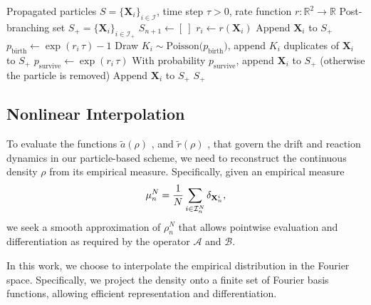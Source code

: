 \documentclass[a4paper,fleqn]{cas-sc}
\theoremstyle{definition}
\theoremstyle{remark}
\begin{document}
\begin{algorithm}
\caption{Birth--Death Step}\label{alg:birthdeath}
\begin{algorithmic}
\Require Propagated particles $S=\{\mathbf X_{i}\}_{i\in\mathcal I}$, time step $\tau>0$, rate function $r:\mathbb R^2\to\mathbb R$
\Ensure Post-branching set $S_{+}=\{\mathbf X_{i}\}_{i\in\mathcal I_{+}}$
    \State $S_{n+1}\gets [\ ]$
        \State $r_i \gets r(\mathbf X_{i})$
         
            \State Append $\mathbf X_{i}$ to $S_{+}$ 
            \State $p_{\mathrm{birth}} \gets \exp(r_i\,\tau) - 1$
            \State Draw $K_i \sim \mathrm{Poisson}\!\big(p_{\mathrm{birth}}\big)$, append $K_i$ duplicates of $\mathbf X_{i}$ to $S_{+}$
         
            \State $p_{\mathrm{survive}}\gets \exp(r_i\,\tau)$ 
            \State With probability $p_{\mathrm{survive}}$, append $\mathbf X_{i}$ to $S_{+}$
            \State \quad (otherwise the particle is removed)
        \Else {}
            \State Append $\mathbf X_{i}$ to $S_{+}$
        \EndIf
    \EndFor
    \State \Return $S_{+}$
\EndProcedure
\end{algorithmic}
\end{algorithm}




\subsection{Nonlinear Interpolation}
\label{sec:interpolation}
To evaluate the functions $\tilde a(\rho)$ , and $\tilde r(\rho)$ , that govern the drift and reaction dynamics in our particle-based scheme, we need to reconstruct the continuous density 
$\rho$ from its empirical measure. Specifically, given an empirical measure
\[
\mu^N_n= \frac{1}{N}\sum_{i\in \mathcal I^N_n}\delta_{\mathbf{X}^i_n},
\] 
we seek a smooth approximation of $\rho^N_n$ that allows pointwise evaluation and differentiation as required by the operator $\mathcal{A}$ and $\mathcal{B}$.

In this work, we choose to interpolate the empirical distribution in the Fourier space. Specifically, we project the density onto a finite set of Fourier basis functions, allowing efficient representation and differentiation. 
\end{document}
